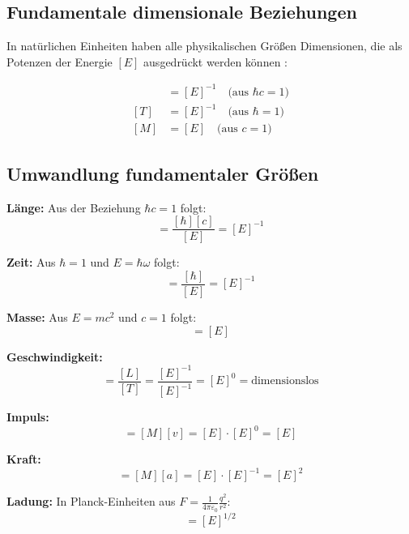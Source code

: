 \documentclass[11pt,a4paper]{article}
\begin{document}
	\subsection{Fundamentale dimensionale Beziehungen}
	
	In natürlichen Einheiten haben alle physikalischen Größen Dimensionen, die als Potenzen der Energie $[E]$ ausgedrückt werden können \cite{weinberg1995,peskin1995}:
	
	\begin{align}
		[L] &= [E]^{-1} \quad \text{(aus } \hbar c = 1\text{)} \\
		[T] &= [E]^{-1} \quad \text{(aus } \hbar = 1\text{)} \\
		[M] &= [E] \quad \text{(aus } c = 1\text{)}
	\end{align}
	
	\subsection{Umwandlung fundamentaler Größen}
	
	\textbf{Länge:} Aus der Beziehung $\hbar c = 1$ folgt:
	\begin{equation}
		[L] = \frac{[\hbar][c]}{[E]} = [E]^{-1}
	\end{equation}
	
	\textbf{Zeit:} Aus $\hbar = 1$ und $E = \hbar \omega$ folgt:
	\begin{equation}
		[T] = \frac{[\hbar]}{[E]} = [E]^{-1}
	\end{equation}
	
	\textbf{Masse:} Aus $E = mc^2$ und $c = 1$ folgt:
	\begin{equation}
		[M] = [E]
	\end{equation}
	
	\textbf{Geschwindigkeit:} 
	\begin{equation}
		[v] = \frac{[L]}{[T]} = \frac{[E]^{-1}}{[E]^{-1}} = [E]^0 = \text{dimensionslos}
	\end{equation}
	
	\textbf{Impuls:}
	\begin{equation}
		[p] = [M][v] = [E] \cdot [E]^0 = [E]
	\end{equation}
	
	\textbf{Kraft:}
	\begin{equation}
		[F] = [M][a] = [E] \cdot [E]^{-1} = [E]^2
	\end{equation}
	
	\textbf{Ladung:} In Planck-Einheiten aus $F = \frac{1}{4\pi\varepsilon_0} \frac{q^2}{r^2}$:
	\begin{equation}
		[q] = [E]^{1/2}
	\end{equation}
	
\end{document}
